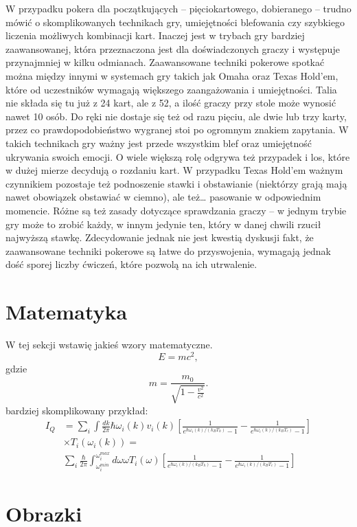 \documentclass{article}
\begin{document}
W przypadku pokera dla początkujących – pięciokartowego, dobieranego – trudno mówić o skomplikowanych technikach gry, umiejętności blefowania czy szybkiego liczenia możliwych kombinacji kart. Inaczej jest w trybach gry bardziej zaawansowanej, która przeznaczona jest dla doświadczonych graczy i występuje przynajmniej w kilku odmianach.
Zaawansowane techniki pokerowe spotkać można między innymi w systemach gry takich jak Omaha oraz Texas Hold’em, które od uczestników wymagają większego zaangażowania i umiejętności. Talia nie składa się tu już z 24 kart, ale z 52, a ilość graczy przy stole może wynosić nawet 10 osób. Do ręki nie dostaje się też od razu pięciu, ale dwie lub trzy karty, przez co prawdopodobieństwo wygranej stoi po ogromnym znakiem zapytania. W takich technikach gry ważny jest przede wszystkim blef oraz umiejętność ukrywania swoich emocji. O wiele większą rolę odgrywa też przypadek i los, które w dużej mierze decydują o rozdaniu kart. W przypadku Texas Hold’em ważnym czynnikiem pozostaje też podnoszenie stawki i obstawianie (niektórzy grają mają nawet obowiązek obstawiać w ciemno), ale też… pasowanie w odpowiednim momencie. Różne są też zasady dotyczące sprawdzania graczy – w jednym trybie gry może to zrobić każdy, w innym jedynie ten, który w danej chwili rzucił najwyższą stawkę. Zdecydowanie jednak nie jest kwestią dyskusji fakt, że zaawansowane techniki pokerowe są łatwe do przyswojenia, wymagają jednak dość sporej liczby ćwiczeń, które pozwolą na ich utrwalenie.


\section{Matematyka}\label{sec:matematyka}
W tej sekcji wstawię jakieś wzory matematyczne.
\begin{equation}
    E = mc^2,
    \label{eqn:wzor1}
\end{equation}
gdzie
\begin{equation}
    m = \frac{m_0}{\sqrt{1-\frac{v^2}{c^2}}}.
\end{equation}
bardziej skomplikowany przykład:
\begin{equation}
\begin{split}
I_Q & = \sum_i \int \frac{dk}{2 \pi} \hbar \omega_i(k) v_i(k) \left[\frac{1}{e^{\hbar \omega_i(k) / (k_B T_h)} -1} - \frac{1}{e^{\hbar \omega_i(k) / (k_B T_c)} -1} \right] \\
& \times T_{i}(\omega_i(k)) = \\
& \sum_i \frac{\hbar}{2\pi} \int_{\omega_i^{min}}^{\omega_i^{max}} d\omega \omega T_{i}(\omega) \left[\frac{1}{e^{\hbar \omega_i(k) / (k_B T_h)} -1} - \frac{1}{e^{\hbar \omega_i(k) / (k_B T_c)} -1} \right]
\end{split}
\end{equation} 

\section{Obrazki}\label{sec:obrazki}
\end{document}
